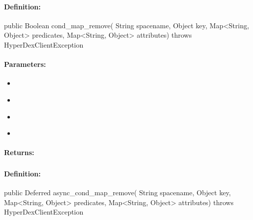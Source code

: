 \paragraph{Definition:}
\begin{javacode}
public Boolean cond_map_remove(
        String spacename,
        Object key,
        Map<String, Object> predicates,
        Map<String, Object> attributes) throws HyperDexClientException
\end{javacode}

\paragraph{Parameters:}
\begin{itemize}[noitemsep]
\item {}\\

\item {}\\

\item {}\\

\item {}\\

\end{itemize}

\paragraph{Returns:}


\pagebreak
\subsubsection{}
\label{api:java:async_cond_map_remove}


\paragraph{Definition:}
\begin{javacode}
public Deferred async_cond_map_remove(
        String spacename,
        Object key,
        Map<String, Object> predicates,
        Map<String, Object> attributes) throws HyperDexClientException
\end{javacode}

